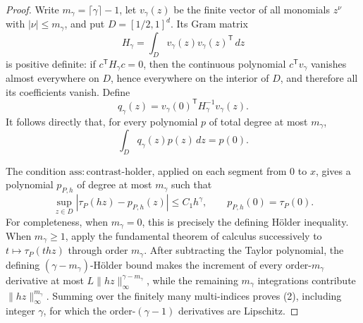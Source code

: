 \documentclass{article}
\begin{document}
\begin{proof}
Write \(m_\gamma=\lceil\gamma\rceil-1\), let \(v_\gamma(z)\) be the finite vector of all monomials \(z^\nu\) with \(|\nu|\leq m_\gamma\), and put \(D=[1/2,1]^d\).  Its Gram matrix
\[
 H_\gamma=\int_Dv_\gamma(z)v_\gamma(z)^{\mathsf T}\,dz
\]
is positive definite: if \(c^{\mathsf T}H_\gamma c=0\), then the continuous polynomial \(c^{\mathsf T}v_\gamma\) vanishes almost everywhere on \(D\), hence everywhere on the interior of \(D\), and therefore all its coefficients vanish.  Define
\[
 q_\gamma(z)=v_\gamma(0)^{\mathsf T}H_\gamma^{-1}v_\gamma(z).
\]
It follows directly that, for every polynomial \(p\) of total degree at most \(m_\gamma\),
\[
 \int_Dq_\gamma(z)p(z)\,dz=p(0).
 \tag{1}
\]

The condition \(\mathrm{ass:contrast\mbox{-}holder}\), applied on each segment from \(0\) to \(x\), gives a polynomial \(p_{P,h}\) of degree at most \(m_\gamma\) such that
\[
 \sup_{z\in D}\left|\tau_P(hz)-p_{P,h}(z)\right|\leq C_1h^\gamma,
 \qquad p_{P,h}(0)=\tau_P(0).
 \tag{2}
\]
For completeness, when \(m_\gamma=0\), this is precisely the defining H\"older inequality.  When \(m_\gamma\geq1\), apply the fundamental theorem of calculus successively to \(t\mapsto\tau_P(thz)\) through order \(m_\gamma\).  After subtracting the Taylor polynomial, the defining \((\gamma-m_\gamma)\)-H\"older bound makes the increment of every order-\(m_\gamma\) derivative at most \(L\lVert hz\rVert_\infty^{\gamma-m_\gamma}\), while the remaining \(m_\gamma\) integrations contribute \(\lVert hz\rVert_\infty^{m_\gamma}\).  Summing over the finitely many multi-indices proves (2), including integer \(\gamma\), for which the order-\((\gamma-1)\) derivatives are Lipschitz.


\end{proof}
\end{document}
